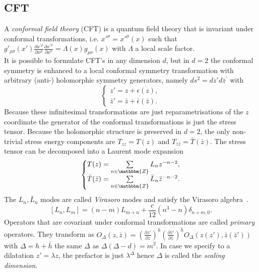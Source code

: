 \documentclass{PoS}
\newcommand{\LF}{\left(}
\newcommand{\RF}{\right)}
\newcommand{\LT}{\left[}
\newcommand{\RT}{\right]}
\begin{document}
\subsection{CFT}
A \textit{conformal field theory} (CFT) is a quantum field theory that is invariant under conformal transformations, i.e.  $x'^{\mu} = x'^{\mu}(x)$ such that $g'_{\rho\sigma}(x') \frac{\partial x^{'\rho}}{\partial x^\mu} \frac{\partial x^{'\sigma}}{\partial x^\nu} = \Lambda(x) g_{\mu\nu}(x)$ with $\Lambda$ a local scale factor.\\

It is possible to formulate CFT's in any dimension $d$, but in $d=2$ the conformal symmetry is enhanced to a local conformal symmetry transformation with arbitrary (anti-) holomorphic symmetry generators, namely $ds^2 = dz'd\bar{z}^{'}$ with 
\begin{equation}
\left\{ 
\begin{matrix}
z' = z + \epsilon(z),\\
\bar{z}' = \bar{z} + \bar{\epsilon}(\bar{z}).
\end{matrix}
\right.
\end{equation}
Because these infinitesimal transformations are just reparametrisations of the $z$ coordinate the generator of the conformal transformations is just the stress tensor. Because the holomorphic structure is preserved in $d=2$, the only non-trivial stress energy components are $T_{zz}= T(z)$ and $T_{\bar{z}\bar{z}}= \bar{T}(\bar{z})$. The stress tensor can be decomposed into a Laurent mode expansion
\begin{equation}
\left\{
\begin{matrix}
T(z) = \sum\limits_{n\in \mathbbm{Z}} L_n z^{-n-2},\\
\bar{T}(\bar{z}) = \sum\limits_{n\in\mathbbm{Z}} \bar{L}_n \bar{z}^{-n-2}.
\end{matrix}
\right.
\end{equation}
The $L_n,\bar{L}_n$ modes are called \textit{Virasoro} modes and satisfy the Virasoro algebra~\cite{DiFrancesco:1997nk}.
\begin{equation}
\LT L_n, L_m\RT = (n-m) L_{m+n} +\frac{c}{12}\LF n^3-n\RF \delta_{n+m,0}.
\end{equation}
Operators that are covariant under conformal transformations are called \textit{primary} operators. They transform as $O_\Delta (z,\bar{z}) = \LF \frac{\partial z'}{\partial z}\RF^h \LF \frac{\partial\bar{z}'}{\partial \bar{z}}\RF^{\bar{h}} O_\Delta \LF z(z'),\bar{z}(\bar{z}')\RF$ with $\Delta= h+\bar{h}$ the same $\Delta$ as $\Delta(\Delta-d)=m^2$. In case we specify to a dilatation $z'= \lambda z$, the prefactor is just $\lambda^{\Delta}$ hence $\Delta$ is called the \textit{scaling dimension}.\\
\end{document}
